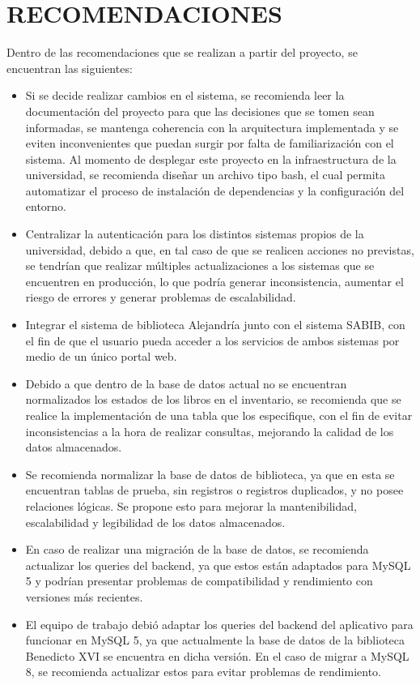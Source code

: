 \documentclass[spanish]{ieee_upb}
\begin{document}
\section{RECOMENDACIONES}
Dentro de las recomendaciones que se realizan a partir del proyecto, se encuentran las siguientes:
\begin{itemize}
\item Si se decide realizar cambios en el sistema, se recomienda leer la documentación del proyecto para que las decisiones que se tomen sean informadas, se mantenga coherencia con la arquitectura implementada y se eviten inconvenientes que puedan surgir por falta de familiarización con el sistema. Al momento de desplegar este proyecto en la infraestructura de la universidad, se recomienda diseñar un archivo tipo bash, el cual permita automatizar el proceso de instalación de dependencias y la configuración del entorno. 
\item Centralizar la autenticación para los distintos sistemas propios de la universidad, debido a que, en tal caso de que se realicen acciones no previstas, se tendrían que realizar múltiples actualizaciones a los sistemas que se encuentren en producción, lo que podría generar inconsistencia, aumentar el riesgo de errores y generar problemas de escalabilidad.
\item Integrar el sistema de biblioteca Alejandría junto con el sistema SABIB, con el fin de que el usuario pueda acceder a los servicios de ambos sistemas por medio de un único portal web.
\item Debido a que dentro de la base de datos actual no se encuentran normalizados los estados de los libros en el inventario, se recomienda que se realice la implementación de una tabla que los especifique, con el fin de evitar inconsistencias a la hora de realizar consultas, mejorando la calidad de los datos almacenados.
\item Se recomienda normalizar la base de datos de biblioteca, ya que en esta se encuentran tablas de prueba, sin registros o registros duplicados, y no posee relaciones lógicas. Se propone esto para mejorar la mantenibilidad, escalabilidad y legibilidad de los datos almacenados.
\item En caso de realizar una migración de la base de datos, se recomienda actualizar los queries del backend, ya que estos están adaptados para MySQL 5 y podrían presentar problemas de compatibilidad y rendimiento con versiones más recientes.
\item  El equipo de trabajo debió adaptar los queries del backend del aplicativo para funcionar en MySQL 5, ya que actualmente la base de datos de la biblioteca Benedicto XVI se encuentra en dicha versión. En el caso de migrar a MySQL 8, se recomienda actualizar estos para evitar problemas de rendimiento.  


\end{itemize}
\end{document}
